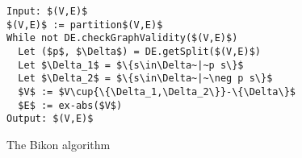 
\begin{figure}[!t]

\begin{lstlisting}[mathescape=true,morekeywords={Input,Output}]
Input: $(V,E)$
$(V,E)$ := partition$(V,E)$
While not DE.checkGraphValidity($(V,E)$)
  Let ($p$, $\Delta$) = DE.getSplit($(V,E)$)
  Let $\Delta_1$ = $\{s\in\Delta~|~p s\}$
  Let $\Delta_2$ = $\{s\in\Delta~|~\neg p s\}$
  $V$ := $V\cup{\{\Delta_1,\Delta_2\}}-\{\Delta\}$
  $E$ := ex-abs($V$)
Output: $(V,E)$
\end{lstlisting}

\caption{The Bikon algorithm}
\label{fig:bikon_alg}

\end{figure}





